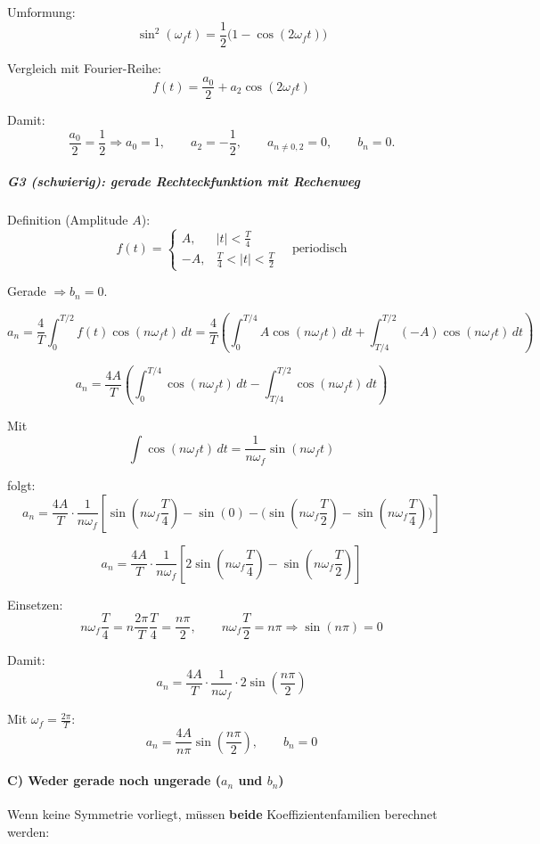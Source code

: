 Umformung:
\[
\sin^2(\omega_f t)=\frac{1}{2}\big(1-\cos(2\omega_f t)\big)
\]

Vergleich mit Fourier-Reihe:
\[
f(t)=\frac{a_0}{2}+a_2\cos(2\omega_f t)
\]

Damit:
\[
\boxed{\frac{a_0}{2}=\frac{1}{2}\Rightarrow a_0=1},
\qquad
\boxed{a_2=-\frac{1}{2}},
\qquad
\boxed{a_{n\neq 0,2}=0},
\qquad
\boxed{b_n=0}.
\]

\subparagraph{G3 (schwierig): gerade Rechteckfunktion mit Rechenweg}

Definition (Amplitude $A$):
\[
f(t)=
\begin{cases}
A, & |t|<\frac{T}{4}\\
-A, & \frac{T}{4}<|t|<\frac{T}{2}
\end{cases}
\quad \text{periodisch}
\]

Gerade $\Rightarrow b_n=0$.

\[
a_n=\frac{4}{T}\int_0^{T/2} f(t)\cos(n\omega_f t)\,dt
=\frac{4}{T}\left(
\int_0^{T/4} A\cos(n\omega_f t)\,dt
+\int_{T/4}^{T/2} (-A)\cos(n\omega_f t)\,dt
\right)
\]

\[
a_n=\frac{4A}{T}\left(
\int_0^{T/4}\cos(n\omega_f t)\,dt
-\int_{T/4}^{T/2}\cos(n\omega_f t)\,dt
\right)
\]

Mit
\[
\int \cos(n\omega_f t)\,dt=\frac{1}{n\omega_f}\sin(n\omega_f t)
\]

folgt:
\[
a_n=\frac{4A}{T}\cdot\frac{1}{n\omega_f}
\left[
\sin\!\left(n\omega_f\frac{T}{4}\right)-\sin(0)
-\Big(\sin(n\omega_f\frac{T}{2})-\sin(n\omega_f\frac{T}{4})\Big)
\right]
\]

\[
a_n=\frac{4A}{T}\cdot\frac{1}{n\omega_f}
\left[
2\sin\!\left(n\omega_f\frac{T}{4}\right)-\sin\!\left(n\omega_f\frac{T}{2}\right)
\right]
\]

Einsetzen:
\[
n\omega_f\frac{T}{4}=n\frac{2\pi}{T}\frac{T}{4}=\frac{n\pi}{2},
\qquad
n\omega_f\frac{T}{2}=n\pi
\Rightarrow \sin(n\pi)=0
\]

Damit:
\[
\boxed{
a_n=\frac{4A}{T}\cdot\frac{1}{n\omega_f}\cdot 2\sin\!\left(\frac{n\pi}{2}\right)
}
\]

Mit $\omega_f=\frac{2\pi}{T}$:
\[
\boxed{
a_n=\frac{4A}{n\pi}\sin\!\left(\frac{n\pi}{2}\right),
\qquad
b_n=0
}
\]

\paragraph{C) Weder gerade noch ungerade ($a_n$ und $b_n$)}

Wenn keine Symmetrie vorliegt, müssen \textbf{beide} Koeffizientenfamilien berechnet werden:

